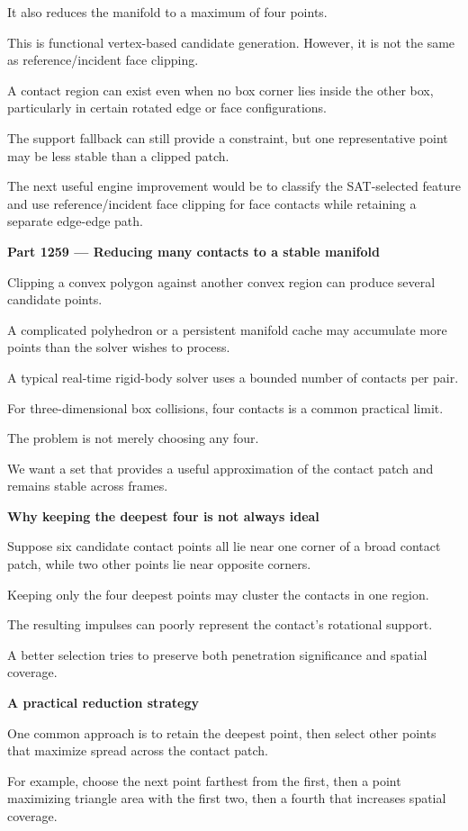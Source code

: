 It also reduces the manifold to a maximum of four points.

This is functional vertex-based candidate generation. However, it is not the same as reference/incident face clipping.

A contact region can exist even when no box corner lies inside the other box, particularly in certain rotated edge or face configurations.

The support fallback can still provide a constraint, but one representative point may be less stable than a clipped patch.

The next useful engine improvement would be to classify the SAT-selected feature and use reference/incident face clipping for face contacts while retaining a separate edge-edge path.

\textbf{Part 1259 --- Reducing many contacts to a stable manifold}

Clipping a convex polygon against another convex region can produce several candidate points.

A complicated polyhedron or a persistent manifold cache may accumulate more points than the solver wishes to process.

A typical real-time rigid-body solver uses a bounded number of contacts per pair.

For three-dimensional box collisions, four contacts is a common practical limit.

The problem is not merely choosing any four.

We want a set that provides a useful approximation of the contact patch and remains stable across frames.

\textbf{Why keeping the deepest four is not always ideal}

Suppose six candidate contact points all lie near one corner of a broad contact patch, while two other points lie near opposite corners.

Keeping only the four deepest points may cluster the contacts in one region.

The resulting impulses can poorly represent the contact's rotational support.

A better selection tries to preserve both penetration significance and spatial coverage.

\textbf{A practical reduction strategy}

One common approach is to retain the deepest point, then select other points that maximize spread across the contact patch.

For example, choose the next point farthest from the first, then a point maximizing triangle area with the first two, then a fourth that increases spatial coverage.

